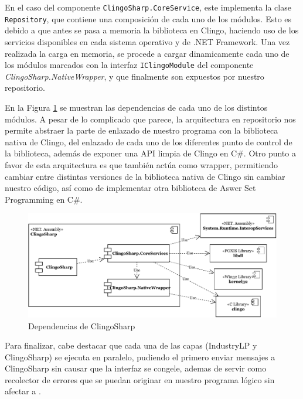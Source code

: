 En el caso del componente \texttt{ClingoSharp.CoreService}, este implementa la clase \texttt{Repository}, que contiene una composición de cada uno de los módulos. Esto es debido a que antes se pasa a memoria la biblioteca en Clingo, haciendo uso de los servicios disponibles en cada sistema operativo y de .NET Framework. Una vez realizada la carga en memoria, se procede a cargar dinamicamente cada uno de los módulos marcados con la interfaz \texttt{IClingoModule} del componente \textit{ClingoSharp.NativeWrapper}, y que finalmente son expuestos por nuestro repositorio.

En la Figura \ref{fig:clingosharp} se muestran las dependencias de cada uno de los distintos módulos. A pesar de lo complicado que parece, la arquitectura en repositorio nos permite abstraer la parte de enlazado de nuestro programa con la biblioteca nativa de Clingo, del enlazado de cada uno de los diferentes punto de control de la biblioteca, además de exponer una API limpia de Clingo en C\#. Otro punto a favor de esta arquitectura es que también actúa como wrapper, permitiendo cambiar entre distintas versiones de la biblioteca nativa de Clingo sin cambiar nuestro código, así como de implementar otra biblioteca de Aswer Set Programming en C\#.

\begin{figure}[!h]
	\centering
	\includegraphics[width=\textwidth]{images/clingosharp}
	\caption{Dependencias de ClingoSharp}
	\label{fig:clingosharp}
\end{figure}

Para finalizar, cabe destacar que cada una de las capas (IndustryLP y ClingoSharp) se ejecuta en paralelo, pudiendo el primero enviar mensajes a ClingoSharp sin causar que la interfaz se congele, ademas de servir como recolector de errores que se puedan originar en nuestro programa lógico sin afectar a \cities.